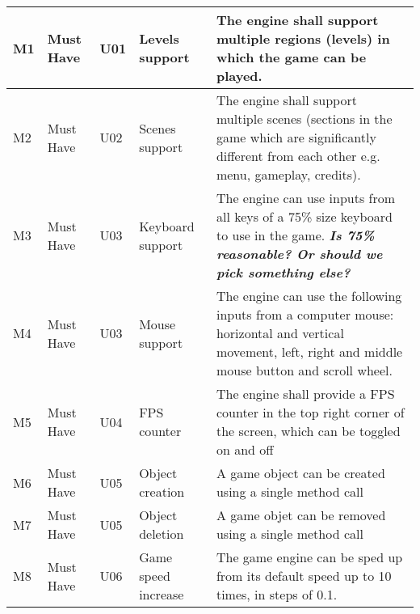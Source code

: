 \documentclass{article} %
\begin{document}
\begin{longtable}{|p{}|p{}|p{}|p{}|p{}|}
    M1                          & Must Have                          & U01                & Levels support                    & The engine shall support multiple regions (levels) in which the game can be played.                                                                         \\ \hline
    M2                          & Must Have                          & U02                & Scenes support                    & The engine shall support multiple scenes (sections in the game which are significantly different from each other e.g. menu, gameplay, credits).             \\ \hline
    M3                          & Must Have                          & U03                & Keyboard support                  & The engine can use inputs from all keys of a 75\% size keyboard to use in the game. \textit{\textbf{Is 75\% reasonable? Or should we pick something else?}} \\ \hline
    M4                          & Must Have                          & U03                & Mouse support                     & The engine can use the following inputs from a computer mouse: horizontal and vertical movement, left, right and middle mouse button and scroll wheel.      \\ \hline
    M5                          & Must Have                          & U04                & FPS counter                       & The engine shall provide a FPS counter in the top right corner of the screen, which can be toggled on and off                                               \\ \hline
    M6                          & Must Have                          & U05                & Object creation                   & A game object can be created using a single method call                                                                                                     \\ \hline
    M7                          & Must Have                          & U05                & Object deletion                   & A game objet can be removed using a single method call                                                                                                      \\ \hline
    M8                          & Must Have                          & U06                & Game speed increase               & The game engine can be sped up from its default speed up to 10 times, in steps of 0.1.                                                                      \\ \hline

\end{longtable}
\end{document}
